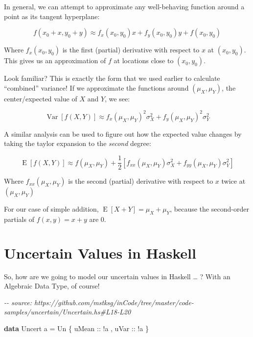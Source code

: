 \documentclass[]{article}
\newenvironment{Shaded}{}{}
\newcommand{\CommentTok}[1]{\textcolor[rgb]{0.38,0.63,0.69}{\textit{#1}}}
\newcommand{\DataTypeTok}[1]{\textcolor[rgb]{0.56,0.13,0.00}{#1}}
\newcommand{\KeywordTok}[1]{\textcolor[rgb]{0.00,0.44,0.13}{\textbf{#1}}}
\newcommand{\NormalTok}[1]{#1}
\newcommand{\OperatorTok}[1]{\textcolor[rgb]{0.40,0.40,0.40}{#1}}
\newcommand{\OtherTok}[1]{\textcolor[rgb]{0.00,0.44,0.13}{#1}}
\begin{document}
In general, we can attempt to approximate any well-behaving function around a
point as its tangent hyperplane:

\[
f(x_0 + x, y_0 + y) \approx f_x(x_0, y_0) x + f_y(x_0, y_0) y + f(x_0, y_0)
\]

Where \(f_x(x_0,y_0)\) is the first (partial) derivative with respect to \(x\)
at \((x_0, y_0)\). This gives us an approximation of \(f\) at locations close to
\((x_0, y_0)\).

Look familiar? This is exactly the form that we used earlier to calculate
``combined'' variance! If we approximate the functions around
\((\mu_X, \mu_Y)\), the center/expected value of \(X\) and \(Y\), we see:

\[
\operatorname{Var}[f(X,Y)] \approx f_x(\mu_X, \mu_Y)^2 \sigma_X^2 + f_y(\mu_X,\mu_Y)^2 \sigma_Y^2
\]

A similar analysis can be used to figure out how the expected value changes by
taking the taylor expansion to the \emph{second} degree:

\[
\operatorname{E}[f(X,Y)] \approx
f(\mu_X, \mu_Y) + \frac{1}{2}
\left[ f_{xx}(\mu_X, \mu_Y) \sigma_X^2 + f_{yy}(\mu_X, \mu_Y) \sigma_Y^2 \right]
\]

Where \(f_{xx}(\mu_X, \mu_Y)\) is the second (partial) derivative with respect
to \(x\) twice at \((\mu_X, \mu_Y)\)

For our case of simple addition, \(\operatorname{E}[X + Y] = \mu_X + \mu_Y\),
because the second-order partials of \(f(x,y) = x + y\) are 0.

\section{Uncertain Values in Haskell}\label{uncertain-values-in-haskell}

So, how are we going to model our uncertain values in Haskell \ldots{} ? With an
Algebraic Data Type, of course!

\begin{Shaded}
\begin{Highlighting}[]
\CommentTok{{-}{-} source: https://github.com/mstksg/inCode/tree/master/code{-}samples/uncertain/Uncertain.hs\#L18{-}L20}

\KeywordTok{data} \DataTypeTok{Uncert}\NormalTok{ a }\OtherTok{=} \DataTypeTok{Un}\NormalTok{ \{}\OtherTok{ uMean ::} \OperatorTok{!}\NormalTok{a}
\NormalTok{                   ,}\OtherTok{ uVar  ::} \OperatorTok{!}\NormalTok{a}
\NormalTok{                   \}}
\end{Highlighting}
\end{Shaded}
\end{document}
